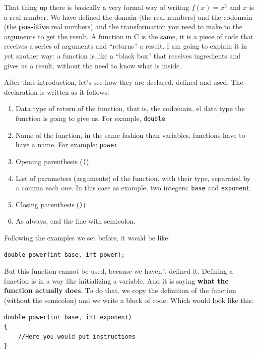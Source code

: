 \documentclass[a4paper]{article}
\begin{document}
That thing up there is basically a very formal way of writing $f(x) = x^2$
and $x$ is a real number. We have defined the domain (the real numbers) and the
codomain (the \textbf{possitive} real numbers) and the transformation you need
to make to the arguments to get the result. A function in C is the same, it is
a piece of code that receives a series of arguments and ``returns'' a result.
I am going to explain it in yet another way: a function is like a ``black box''
that receives ingredients and gives us a result, without the need to know what
is inside.

After that introduction, let's see how they are declared, defined and used.
The declaration is written as it follows:
\begin{enumerate}
\item Data type of return of the function, that is, the codomain, el data type
the function is going to give us. For example, \lstinline[style=C]{double}.
\item Name of the function, in the same fashion than variables, functions have
to have a name. For example: \verb!power!
\item Opening parenthesis (\texttt{(})
\item List of parameters (arguments) of the function, with their type, separated
by a comma each one. In this case as example, two integers: \verb!base! and
\verb!exponent!.
\item Closing parenthesis (\texttt{)})
\item As always, end the line with semicolon.
\end{enumerate}

Following the examples we set before, it would be like:

\noindent
\begin{minipage}[H]{\linewidth}
\mbox{}
\begin{lstlisting}[style=C, label={lst:functionDeclaration},
caption={Function declaration in C}]
double power(int base, int power);
\end{lstlisting}
\end{minipage}

But this function cannot be used, because we haven't defined it. Defining a
function is in a way like initializing a variable. And it is saying
\textbf{what the function actually does}. To do that, we copy the definition of
the function (without the semicolon) and we write a block of code. Which would
look like this:

\noindent
\begin{minipage}[H]{\linewidth}
\mbox{}
\begin{lstlisting}[style=C, label={lst:functionDefinition},
caption={Definition of a function in C}]
double power(int base, int exponent)
{
    //Here you would put instructions
}
\end{lstlisting}
\end{minipage}
\end{document}
